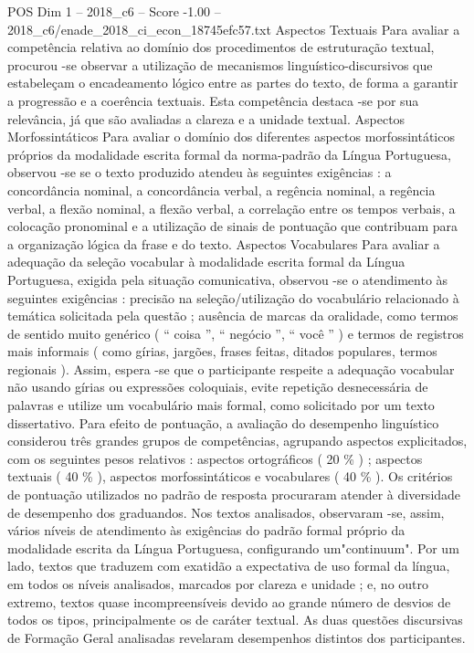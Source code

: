 \begin{textsample}{POS Dim 1 – 2018\_c6 – Score -1.00 – 2018\_c6/enade\_2018\_ci\_econ\_18745efc57.txt}
Aspectos Textuais Para avaliar a competência relativa ao domínio dos procedimentos de estruturação textual, procurou -se observar a utilização de mecanismos linguístico-discursivos que estabeleçam o encadeamento lógico entre as partes do texto, de forma a garantir a progressão e a coerência textuais.
Esta competência destaca -se por sua relevância, já que são avaliadas a clareza e a unidade textual.
Aspectos Morfossintáticos Para avaliar o domínio dos diferentes aspectos morfossintáticos próprios da modalidade escrita formal da norma-padrão da Língua Portuguesa, observou -se se o texto produzido atendeu às seguintes exigências : a concordância nominal, a concordância verbal, a regência nominal, a regência verbal, a flexão nominal, a flexão verbal, a correlação entre os tempos verbais, a colocação pronominal e a utilização de sinais de pontuação que contribuam para a organização lógica da frase e do texto.
Aspectos Vocabulares Para avaliar a adequação da seleção vocabular à modalidade escrita formal da Língua Portuguesa, exigida pela situação comunicativa, observou -se o atendimento às seguintes exigências : precisão na seleção/utilização do vocabulário relacionado à temática solicitada pela questão ; ausência de marcas da oralidade, como termos de sentido muito genérico ( “ coisa ”, “ negócio ”, “ você ” ) e termos de registros mais informais ( como gírias, jargões, frases feitas, ditados populares, termos regionais ).
Assim, espera -se que o participante respeite a adequação vocabular não usando gírias ou expressões coloquiais, evite repetição desnecessária de palavras e utilize um vocabulário mais formal, como solicitado por um texto dissertativo.
Para efeito de pontuação, a avaliação do desempenho linguístico considerou três grandes grupos de competências, agrupando aspectos explicitados, com os seguintes pesos relativos : aspectos ortográficos ( 20 \% ) ; aspectos textuais ( 40 \% ), aspectos morfossintáticos e vocabulares ( 40 \% ).
Os critérios de pontuação utilizados no padrão de resposta procuraram atender à diversidade de desempenho dos graduandos.
Nos textos analisados, observaram -se, assim, vários níveis de atendimento às exigências do padrão formal próprio da modalidade escrita da Língua Portuguesa, configurando um"continuum".
Por um lado, textos que traduzem com exatidão a expectativa de uso formal da língua, em todos os níveis analisados, marcados por clareza e unidade ; e, no outro extremo, textos quase incompreensíveis devido ao grande número de desvios de todos os tipos, principalmente os de caráter textual.
As duas questões discursivas de Formação Geral analisadas revelaram desempenhos distintos dos participantes.

\end{textsample}
